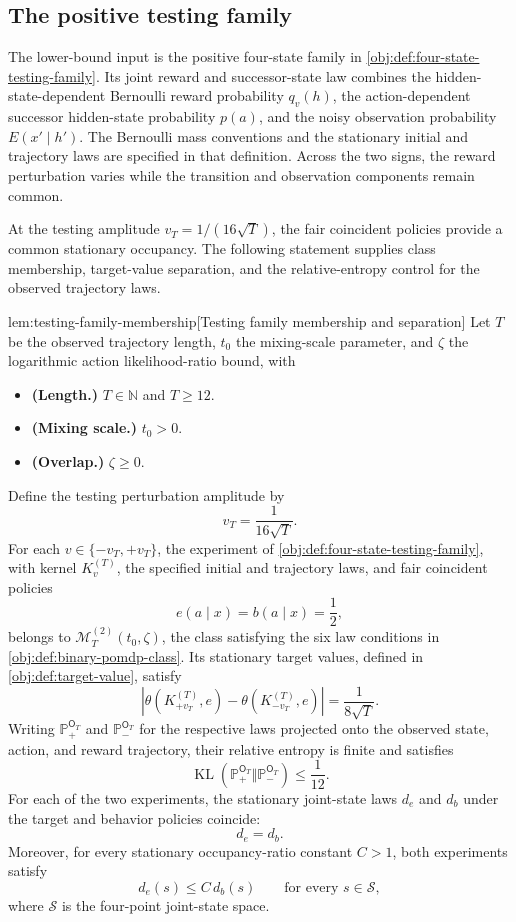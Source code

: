 \subsection{The positive testing family}

The lower-bound input is the positive four-state family in \cref{obj:def:four-state-testing-family}. Its joint reward and successor-state law  combines the hidden-state-dependent Bernoulli reward probability \(q_v(h)\), the action-dependent successor hidden-state probability \(p(a)\), and the noisy observation probability \(E(x'\mid h')\). The Bernoulli mass conventions and the stationary initial and trajectory laws are specified in that definition. Across the two signs, the reward perturbation varies while the transition and observation components remain common.

At the testing amplitude \(v_T=1/(16\sqrt T)\), the fair coincident policies provide a common stationary occupancy. The following statement supplies class membership, target-value separation, and the relative-entropy control for the observed trajectory laws.

\begin{lemmav}{lem:testing-family-membership}[Testing family membership and separation]
Let \(T\) be the observed trajectory length, \(t_0\) the mixing-scale parameter, and \(\zeta\) the logarithmic action likelihood-ratio bound, with
\begin{itemize}
\item \textbf{(Length.)} \(T\in\mathbb N\) and \(T\geq12\).
\item \textbf{(Mixing scale.)} \(t_0>0\).
\item \textbf{(Overlap.)} \(\zeta\geq0\).
\end{itemize}
Define the testing perturbation amplitude by
\[
v_T=\frac{1}{16\sqrt T}.
\]
For each \(v\in\{-v_T,+v_T\}\), the experiment of \cref{obj:def:four-state-testing-family}, with kernel \(K_v^{(T)}\), the specified initial and trajectory laws, and fair coincident policies
\[
e(a\mid x)=b(a\mid x)=\frac12,
\]
belongs to \(\mathcal M_T^{(2)}(t_0,\zeta)\), the class satisfying the six law conditions in \cref{obj:def:binary-pomdp-class}. Its stationary target values, defined in \cref{obj:def:target-value}, satisfy
\[
\left|\theta(K_{+v_T}^{(T)},e)-\theta(K_{-v_T}^{(T)},e)\right|
=\frac{1}{8\sqrt T}.
\]
Writing \(\mathbb P_{+}^{\mathsf O_T}\) and \(\mathbb P_{-}^{\mathsf O_T}\) for the respective laws projected onto the observed state, action, and reward trajectory, their relative entropy is finite and satisfies
\[
\operatorname{KL}\!\left(
\mathbb P_{+}^{\mathsf O_T}\Vert\mathbb P_{-}^{\mathsf O_T}
\right)\leq\frac1{12}.
\]
For each of the two experiments, the stationary joint-state laws \(d_e\) and \(d_b\) under the target and behavior policies coincide:
\[
d_e=d_b.
\]
Moreover, for every stationary occupancy-ratio constant \(C>1\), both experiments satisfy
\[
d_e(s)\leq C\,d_b(s)
\qquad\text{for every }s\in\mathcal S,
\]
where \(\mathcal S\) is the four-point joint-state space.
\end{lemmav}

